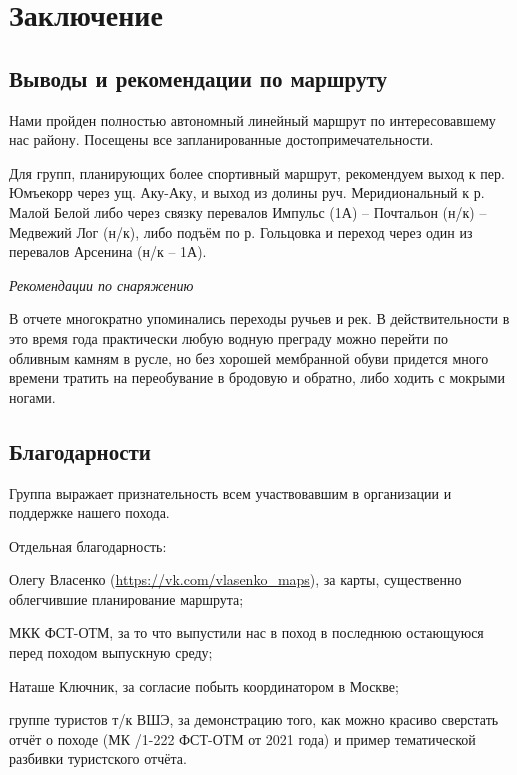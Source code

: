 \section{Заключение}
\subsection{Выводы и рекомендации по маршруту}
Нами пройден полностью автономный линейный маршрут по интересовавшему нас району.
Посещены все запланированные достопримечательности.

Для групп, планирующих более спортивный маршрут, рекомендуем выход к пер. Юмъекорр через ущ. Аку-Аку,
и выход из долины руч. Меридиональный к р. Малой Белой либо через связку
перевалов Импульс (1А) -- Почтальон (н/к) -- Медвежий Лог (н/к), либо подъём по р. Гольцовка
и переход через один из перевалов Арсенина (н/к -- 1А).

\textit{Рекомендации по снаряжению}

В отчете многократно упоминались переходы ручьев и рек.
В действительности в это время года практически любую водную преграду можно перейти по обливным камням в русле,
но без хорошей мембранной обуви придется много времени тратить на переобувание в бродовую и обратно,
либо ходить с мокрыми ногами.

\subsection{Благодарности}
Группа выражает признательность всем участвовавшим в организации и поддержке нашего похода.

Отдельная благодарность:

Олегу Власенко (\textenglish{\url{https://vk.com/vlasenko_maps}}), за карты, существенно облегчившие планирование маршрута;

МКК ФСТ-ОТМ, за то что выпустили нас в поход в последнюю остающуюся перед походом выпускную среду;

Наташе Ключник, за согласие побыть координатором в Москве;

группе туристов т/к ВШЭ, за демонстрацию того, как можно красиво сверстать отчёт о походе
(МК /1-222 ФСТ-ОТМ от 2021 года) и пример тематической разбивки туристского отчёта.
